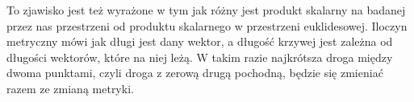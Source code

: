 To zjawisko jest też wyrażone w tym jak różny jest produkt skalarny na badanej przez nas przestrzeni od produktu skalarnego w przestrzeni euklidesowej. Iloczyn metryczny mówi jak długi jest dany wektor, a długość krzywej jest zależna od długości wektorów, które na niej leżą. W takim razie najkrótsza droga między dwoma punktami, czyli droga z zerową drugą pochodną, będzie się zmieniać razem ze zmianą metryki. 

%
%
